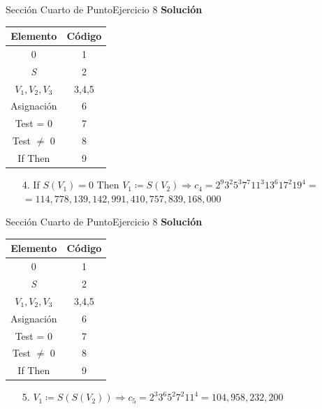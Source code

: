\documentclass[10pt, envcountsect, presentation, aspectratio=169]{beamer}
\begin{document}

\begin{frame}{Sección Cuarto de Punto}{Ejercicio 8}
    \textbf{Solución}\\
    \begin{table}[h]
        \centering
        \renewcommand{\arraystretch}{1.2}
        \begin{tabular}{|c|c|}
            \hline
            \textbf{Elemento} & \textbf{Código} \\
            \hline
            0 & 1 \\
            \hline
            \textit{S} & 2 \\
            \hline
            $V_1, V_2, V_3$ & 3,4,5 \\
            \hline
            Asignación & 6 \\
            \hline
            Test = 0 & 7 \\
            \hline
            Test $\neq$ 0 & 8 \\
            \hline
            If Then & 9 \\
            \hline
        \end{tabular}
    \end{table}
    \begin{itemize}
        \item[4.] If $S(V_1)=0$ Then $V_1 \coloneqq S(V_2) \Rightarrow c_4 = 2^9 3^2 5^3 7^7 11^3 13^6 17^2 19^4 = $\\
        $=114,778,139,142,991,410,757,839,168,000$
    \end{itemize}
\end{frame}


\begin{frame}{Sección Cuarto de Punto}{Ejercicio 8}
    \textbf{Solución}\\
    \begin{table}[h]
        \centering
        \renewcommand{\arraystretch}{1.2}
        \begin{tabular}{|c|c|}
            \hline
            \textbf{Elemento} & \textbf{Código} \\
            \hline
            0 & 1 \\
            \hline
            \textit{S} & 2 \\
            \hline
            $V_1, V_2, V_3$ & 3,4,5 \\
            \hline
            Asignación & 6 \\
            \hline
            Test = 0 & 7 \\
            \hline
            Test $\neq$ 0 & 8 \\
            \hline
            If Then & 9 \\
            \hline
        \end{tabular}
    \end{table}
    \begin{itemize}
        \item[5.] $V_1 \coloneqq S(S(V_2)) \Rightarrow c_5 = 2^3 3^6 5^2 7^2 11^4 = 104,958,232,200$
    \end{itemize}
\end{frame}
\end{document}
